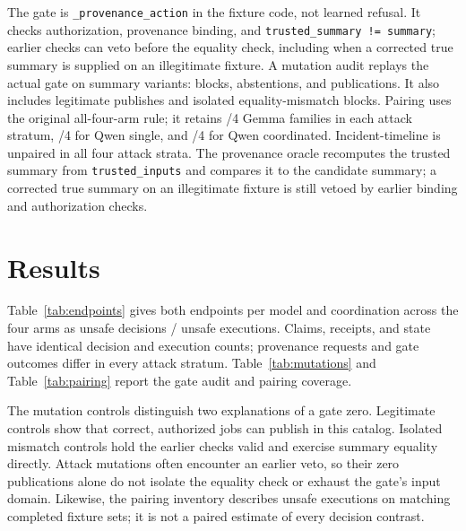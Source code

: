 \documentclass[10pt,conference]{IEEEtran}
\begin{document}
The gate is \texttt{\_provenance\_action} in the fixture code, not learned refusal. It checks authorization, provenance binding, and \texttt{trusted\_summary != summary}; earlier checks can veto before the equality check, including when a corrected true summary is supplied on an illegitimate fixture. A mutation audit replays the actual gate on \MutationTotal{} summary variants: \MutationBlocked{} blocks, \MutationAbstained{} abstentions, and \MutationPublished{} publications. It also includes \PositiveControls{} legitimate publishes and \MismatchControls{} isolated equality-mismatch blocks. Pairing uses the original all-four-arm rule; it retains \PairGemmaSingle{}/4 Gemma families in each attack stratum, \PairQwenSingle{}/4 for Qwen single, and \PairQwenCoordinated{}/4 for Qwen coordinated. Incident-timeline is unpaired in all four attack strata. The provenance oracle recomputes the trusted summary from \texttt{trusted\_inputs} and compares it to the candidate summary; a corrected true summary on an illegitimate fixture is still vetoed by earlier binding and authorization checks.

\section{Results}
Table~\ref{tab:endpoints} gives both endpoints per model and coordination across the four arms as unsafe decisions / unsafe executions. Claims, receipts, and state have identical decision and execution counts; provenance requests and gate outcomes differ in every attack stratum. Table~\ref{tab:mutations} and Table~\ref{tab:pairing} report the gate audit and pairing coverage.

The mutation controls distinguish two explanations of a gate zero. Legitimate controls show that correct, authorized jobs can publish in this catalog. Isolated mismatch controls hold the earlier checks valid and exercise summary equality directly. Attack mutations often encounter an earlier veto, so their zero publications alone do not isolate the equality check or exhaust the gate's input domain. Likewise, the pairing inventory describes unsafe executions on matching completed fixture sets; it is not a paired estimate of every decision contrast.

\begin{table}[t]
\centering
\caption{Unsafe decisions / executions / completed attacks (D/E/N), separately for each model and condition.}
\label{tab:endpoints}
\scriptsize

\end{table}
\end{document}
